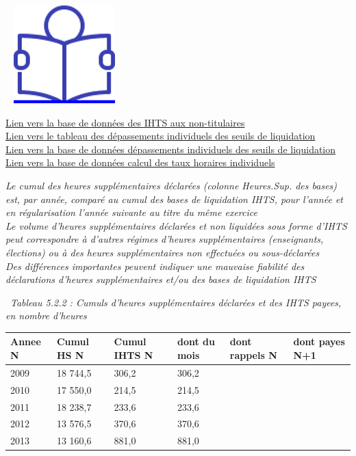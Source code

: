~
\href{../Docs/Notices/fiche_liquidation_IHTS.odt}{\includegraphics{icones/Notice.png}}

\href{../Bases/Reglementation/Base.IHTS.non.tit.csv}{Lien vers la base de
données des IHTS aux non-titulaires}\\
\href{../Bases/Reglementation/depassement.agent.annee.csv}{Lien vers le
tableau des dépassements individuels des seuils de liquidation}\\
\href{../Bases/Reglementation/depassement.agent.csv}{Lien vers la base de
données dépassements individuels des seuils de liquidation}\\
\href{../Bases/Reglementation/Taux.horaires.csv}{Lien vers la base de
données calcul des taux horaires individuels}

\emph{Le cumul des heures supplémentaires déclarées (colonne Heures.Sup.
des bases) est, par année, comparé au cumul des bases de liquidation
IHTS, pour l'année et en régularisation l'année suivante au titre du
même exercice}\\
\emph{Le volume d'heures supplémentaires déclarées et non liquidées sous
forme d'IHTS peut correspondre à d'autres régimes d'heures
supplémentaires (enseignants, élections) ou à des heures supplémentaires
non effectuées ou sous-déclarées}\\
\emph{Des différences importantes peuvent indiquer une mauvaise
fiabilité des déclarations d'heures supplémentaires et/ou des bases de
liquidation IHTS}

~\emph{Tableau 5.2.2 : Cumuls d'heures supplémentaires déclarées et des
IHTS payees, en nombre d'heures}

\begin{longtable}[]{@{}llllll@{}}
\toprule
Annee N & Cumul HS N & Cumul IHTS N & dont du mois & dont rappels N &
dont payes N+1\tabularnewline
\midrule
\endhead
2009 & 18 744,5 & 306,2 & 306,2 & &\tabularnewline
2010 & 17 550,0 & 214,5 & 214,5 & &\tabularnewline
2011 & 18 238,7 & 233,6 & 233,6 & &\tabularnewline
2012 & 13 576,5 & 370,6 & 370,6 & &\tabularnewline
2013 & 13 160,6 & 881,0 & 881,0 & &\tabularnewline
\bottomrule
\end{longtable}

